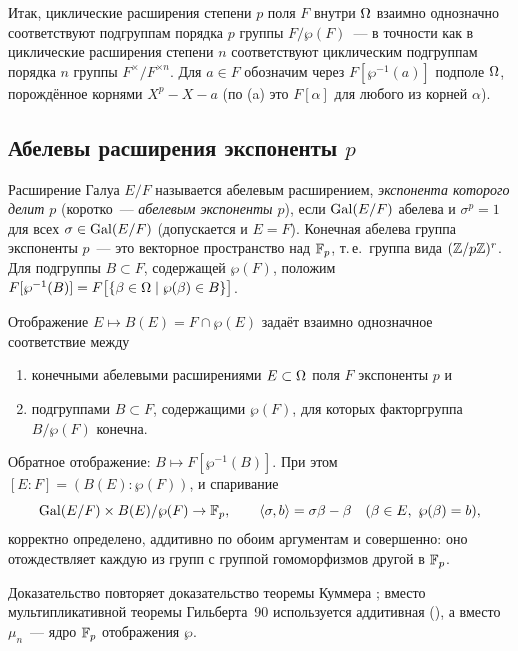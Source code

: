 Итак, циклические расширения степени $p$ поля $F$ внутри $\Omega$ взаимно однозначно соответствуют подгруппам порядка $p$
группы $F/\wp(F)$~--- в точности как в  циклические расширения степени $n$ соответствуют циклическим подгруппам
порядка $n$ группы $F^\times/F^{\times n}$. Для $a\in F$ обозначим через $F[\wp^{-1}(a)]$ подполе $\Omega$, порождённое корнями
$X^p-X-a$ (по (a) это $F[\alpha]$ для любого из корней $\alpha$).

\subsection*{Абелевы расширения экспоненты $p$}

Расширение Галуа $E/F$ называется абелевым расширением, \emph{экспонента которого делит $p$} (коротко~--- \emph{абелевым
экспоненты $p$}), если $\operatorname{Gal}(E/F)$ абелева и $\sigma^p=1$ для всех $\sigma\in\operatorname{Gal}(E/F)$ (допускается и $E=F$). Конечная абелева группа экспоненты $p$~--- это векторное пространство над
$\mathbb F_p$, т.\,е.\ группа вида $(\mathbb Z/p\mathbb Z)^r$. Для подгруппы $B\subset F$, содержащей $\wp(F)$, положим
$F[\wp^{-1}(B)]=F\bigl[\{\beta\in\Omega\mid\wp(\beta)\in B\}\bigr]$.

\begin{theorem}[5.32d]
Отображение $E\mapsto B(E)=F\cap\wp(E)$ задаёт взаимно однозначное соответствие между
\begin{enumerate}[label=\textup{(\alph*)}]
\item конечными абелевыми расширениями $E\subset\Omega$ поля $F$ экспоненты $p$ и
\item подгруппами $B\subset F$, содержащими $\wp(F)$, для которых факторгруппа $B/\wp(F)$ конечна.
\end{enumerate}
Обратное отображение: $B\mapsto F[\wp^{-1}(B)]$. При этом $[E:F]=(B(E):\wp(F))$, и спаривание
\[
\operatorname{Gal}(E/F)\times B(E)/\wp(F)\to\mathbb F_p,\qquad\langle\sigma,b\rangle=\sigma\beta-\beta\quad(\beta\in E,\ \wp(\beta)=b),
\]
корректно определено, аддитивно по обоим аргументам и совершенно: оно отождествляет каждую из групп с группой
гомоморфизмов другой в $\mathbb F_p$.
\end{theorem}

Доказательство повторяет доказательство теоремы Куммера ; вместо мультипликативной теоремы Гильберта~90
используется аддитивная (), а вместо $\mu_n$~--- ядро $\mathbb F_p$ отображения $\wp$.

